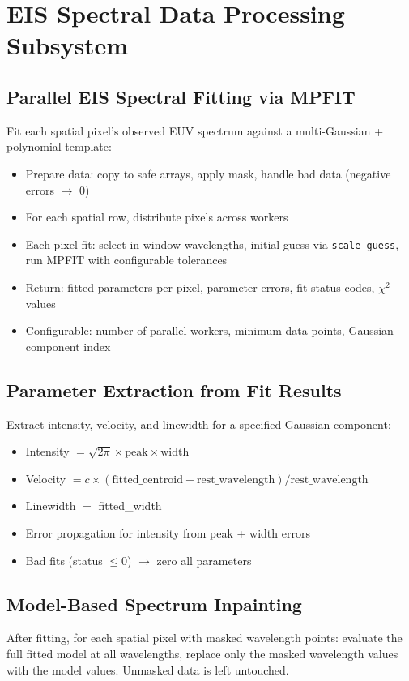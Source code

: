 \documentclass[11pt,a4paper]{article}
\begin{document}
\section{EIS Spectral Data Processing Subsystem}

\subsection{Parallel EIS Spectral Fitting via MPFIT}
Fit each spatial pixel's observed EUV spectrum against a multi-Gaussian + polynomial template:
\begin{itemize}[nosep]
  \item Prepare data: copy to safe arrays, apply mask, handle bad data (negative errors $\rightarrow$ 0)
  \item For each spatial row, distribute pixels across workers
  \item Each pixel fit: select in-window wavelengths, initial guess via \texttt{scale\_guess}, run MPFIT with configurable tolerances
  \item Return: fitted parameters per pixel, parameter errors, fit status codes, $\chi^2$ values
  \item Configurable: number of parallel workers, minimum data points, Gaussian component index
\end{itemize}

\subsection{Parameter Extraction from Fit Results}
Extract intensity, velocity, and linewidth for a specified Gaussian component:
\begin{itemize}[nosep]
  \item Intensity $= \sqrt{2\pi} \times \text{peak} \times \text{width}$
  \item Velocity $= c \times (\text{fitted\_centroid} - \text{rest\_wavelength}) / \text{rest\_wavelength}$
  \item Linewidth $=$ fitted\_width
  \item Error propagation for intensity from peak + width errors
  \item Bad fits (status $\leq 0$) $\rightarrow$ zero all parameters
\end{itemize}

\subsection{Model-Based Spectrum Inpainting}
After fitting, for each spatial pixel with masked wavelength points: evaluate the full fitted model at all wavelengths, replace only the masked wavelength values with the model values. Unmasked data is left untouched.
\end{document}
